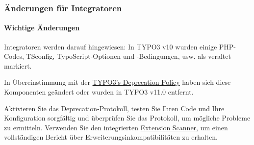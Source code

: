 %

\begin{frame}[fragile]
	\frametitle{Änderungen für Integratoren}
	\framesubtitle{Wichtige Änderungen}

	\small
		Integratoren werden darauf hingewiesen: In TYPO3 v10 wurden einige PHP-Codes, TSconfig, TypoScript-Optionen
		und -Bedingungen, usw. als veraltet markiert.

		\vspace{0.2cm}

		In Übereinstimmung mit der
		\href{https://typo3.org/article/typo3-deprecation-policy}{TYPO3's Deprecation Policy}
		haben sich diese Komponenten geändert oder wurden in TYPO3 v11.0 entfernt.

		\vspace{0.2cm}

		Aktivieren Sie das Deprecation-Protokoll, testen Sie Ihren Code und Ihre Konfiguration
		sorgfältig und überprüfen Sie das Protokoll, um mögliche Probleme zu ermitteln. Verwenden Sie den integrierten
		\href{https://docs.typo3.org/m/typo3/reference-coreapi/master/en-us/ApiOverview/ExtensionScanner/Index.html}{Extension Scanner},
		um einen vollständigen Bericht über Erweiterungsinkompatibilitäten zu erhalten.

	\normalsize

\end{frame}

